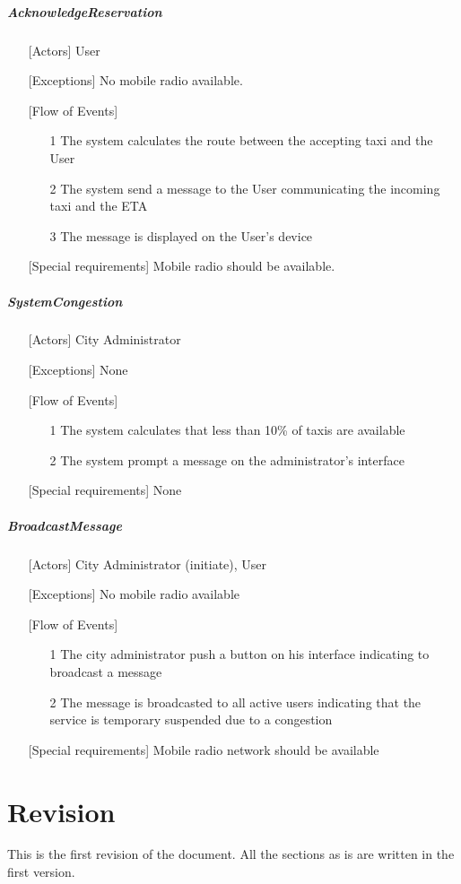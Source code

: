 \documentclass[12pt,a4paper]{book}
\begin{document}
			\paragraph{AcknowledgeReservation}
			\begin{itemize}
				\item[\textbullet] [Actors] User
				\item[\textbullet] [Exceptions] No mobile radio available.
				\item[\textbullet] [Flow of Events]
				\begin{itemize}
					\item[1] The system calculates the route between the accepting taxi and the User
					\item[2] The system send a message to the User communicating the incoming taxi and the ETA
					\item[3] The message is displayed on the User's device
				\end{itemize}
				\item[\textbullet] [Special requirements] Mobile radio should be available.
			\end{itemize}
			\paragraph{SystemCongestion}
			\begin{itemize}
				\item[\textbullet] [Actors] City Administrator
				\item[\textbullet] [Exceptions] None
				\item[\textbullet] [Flow of Events]
				\begin{itemize}
					\item[1] The system calculates that less than 10\% of taxis are available
					\item[2] The system prompt a message on the administrator's interface
				\end{itemize}
				\item[\textbullet] [Special requirements] None
			\end{itemize}
			\paragraph{BroadcastMessage}
			\begin{itemize}
				\item[\textbullet] [Actors] City Administrator (initiate), User
				\item[\textbullet] [Exceptions] No mobile radio available
				\item[\textbullet] [Flow of Events]
				\begin{itemize}
					\item[1] The city administrator push a button on his interface indicating to broadcast a message
					\item[2] The message is broadcasted to all active users indicating that the service is temporary suspended due to a congestion
				\end{itemize}
				\item[\textbullet] [Special requirements] Mobile radio network should be available
			\end{itemize}
	\chapter{Revision}
	This is the first revision of the document. All the sections as is are written in the first version.
\end{document}
